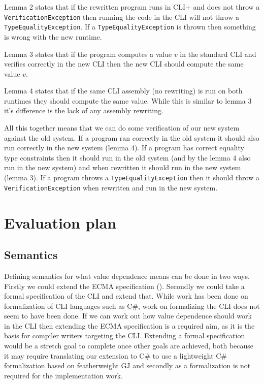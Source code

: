 Lemma 2 states that if the rewritten program runs in CLI+ and does not throw a
\texttt{VerificationException} then running the code in the CLI will not throw
a \texttt{TypeEqualityException}. If a \texttt{TypeEqualityException} is thrown
then something is wrong with the new runtime.

Lemma 3 states that if the program computes a value $v$ in the standard CLI
and verifies correctly in the new CLI then the new CLI should compute the same
value $v$.

Lemma 4 states that if the same CLI assembly (no rewriting) is run on both
runtimes they should compute the same value. While this is similar to lemma 3
it's difference is the lack of any assembly rewriting. 

All this together means that we can do some verification of our new system
against the old system. If a program ran correctly in the old system it should
also run correctly in the new system (lemma 4). If a program has correct equality type
constraints then it should run in the old system (and by the lemma 4 also
run in the new system) and when rewritten it should run in the new system
(lemma 3). If a program throws a \texttt{TypeEqualityException} then it should
throw a \texttt{VerificationException} when rewritten and run in the new
system.


\chapter{Evaluation plan}


\section{Semantics}

Defining semantics for what value dependence means can be done in
two ways. Firstly we could extend the ECMA specification (\cite{ecma-335}).
Secondly we could take a formal specification of the CLI and extend
that. While work has been done on formalization of CLI languages such
as C\#, work on formalizing the CLI does not seem to have been done.
If we can work out how value dependence should work in the CLI then
extending the ECMA specification is a required aim, as it is the basis
for compiler writers targeting the CLI. Extending a formal specification
would be a stretch goal to complete once other goals are achieved,
both because it may require translating our extension to C\# to use
a lightweight C\# formalization based on featherweight GJ and secondly
as a formalization is not required for the implementation work.


